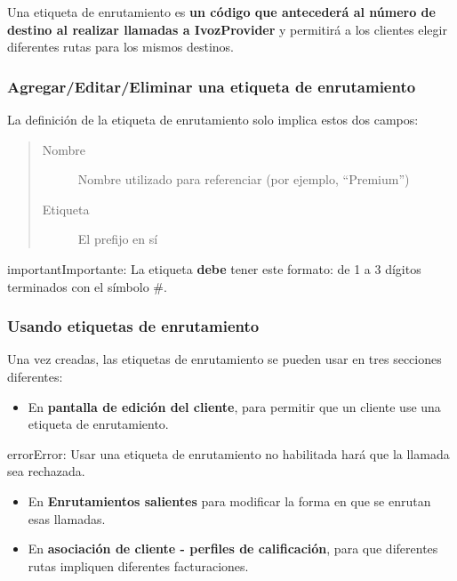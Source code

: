\documentclass[letterpaper,10pt,spanish]{sphinxmanual}
\begin{document}
Una etiqueta de enrutamiento es \textbf{un código que antecederá al número de destino al realizar llamadas a IvozProvider} y permitirá a los clientes elegir diferentes rutas para los mismos destinos.


\subsubsection{Agregar/Editar/Eliminar una etiqueta de enrutamiento}
\label{administration_portal/brand/routing/routing_tags:add-edit-delete-a-routing-tag}
La definición de la etiqueta de enrutamiento solo implica estos dos campos:
\begin{quote}
\begin{description}
\item[{Nombre}] \leavevmode
Nombre utilizado para referenciar (por ejemplo, ``Premium'')

\item[{Etiqueta}] \leavevmode
El prefijo en sí

\end{description}
\end{quote}

\begin{notice}{important}{Importante:}
La etiqueta \textbf{debe} tener este formato: de 1 a 3 dígitos terminados con el símbolo \#.
\end{notice}


\subsubsection{Usando etiquetas de enrutamiento}
\label{administration_portal/brand/routing/routing_tags:using-routing-tags}
Una vez creadas, las etiquetas de enrutamiento se pueden usar en tres secciones diferentes:
\begin{itemize}
\item {} 
En \textbf{pantalla de edición del cliente}, para permitir que un cliente use una etiqueta de enrutamiento.

\end{itemize}

\begin{notice}{error}{Error:}
Usar una etiqueta de enrutamiento no habilitada hará que la llamada sea rechazada.
\end{notice}
\begin{itemize}
\item {} 
En \textbf{Enrutamientos salientes} para modificar la forma en que se enrutan esas llamadas.

\item {} 
En \textbf{asociación de cliente - perfiles de calificación}, para que diferentes rutas impliquen diferentes facturaciones.

\end{itemize}
\end{document}
